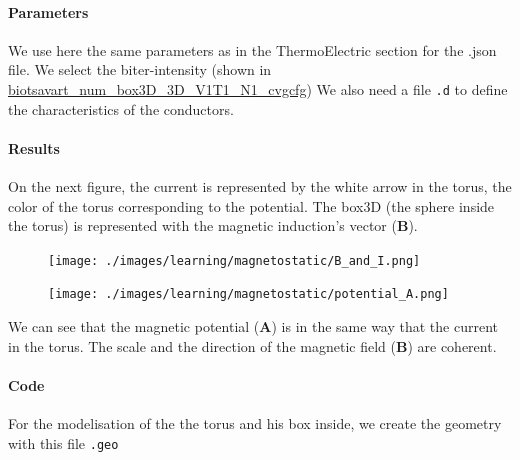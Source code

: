 \documentclass[11pt]{amsart}
\begin{document}
\hypertarget{x-parameters}{\paragraph{Parameters}}
We use here the same parameters as in the ThermoElectric section for the .json file.
We select the biter-intensity (shown in \hyperlink{example.cfg}{biotsavart_num_box3D_3D_V1T1_N1_cvgcfg})
We also need a file \texttt{.d} to define the characteristics of the conductors.


\hypertarget{x-results}{\paragraph{Results}}
On the next figure, the current is represented by the white arrow in the torus, the color of the torus corresponding to the potential.
The box3D (the sphere inside the torus) is represented with the magnetic induction’s vector (\textbf{B}).


\begin{figure}[h]{}
\centering\texttt{[image: ./images/learning/magnetostatic/B\_and\_I.png]}

\centering
\end{figure}

\begin{figure}[h]{}
\centering\texttt{[image: ./images/learning/magnetostatic/potential\_A.png]}

\centering
\end{figure}

We can see that the magnetic potential (\textbf{A}) is in the same way that the current in the torus.
The scale and the direction of the magnetic field (\textbf{B}) are coherent.


\hypertarget{x-code}{\paragraph{Code}}
For the modelisation of the the torus and his box inside, we create the geometry with this file \texttt{.geo}
\end{document}
